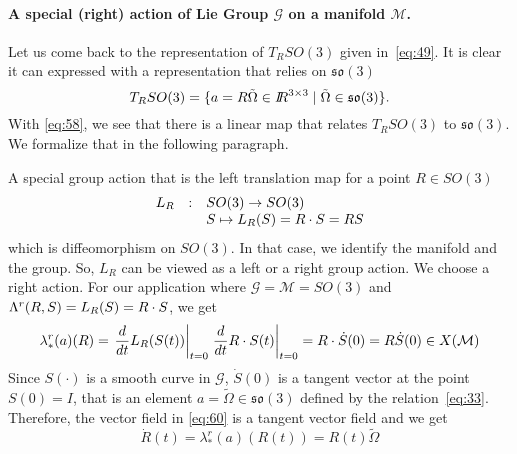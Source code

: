 \paragraph{ A special  (right)  action of Lie Group $\mathcal G$ on a manifold $\mathcal M$. } 

Let us come back to the representation of  $T_RSO(3)$ given in~\eqref{eq:49}. It is clear it can expressed with a representation that relies on $\mathfrak{so}(3)$
\begin{equation}
  \label{eq:58}
   T_RSO(3) = \{ a = R \tilde \Omega \in \mbox{\rm $I\!\!R$}^{3\times 3} \mid \tilde \Omega \in \mathfrak{so}(3) \}.
\end{equation}
With \eqref{eq:58}, we see that there is a linear map that relates $T_RSO(3)$ to  $\mathfrak{so}(3)$. We formalize that in the following paragraph.


A special group action that is  the left translation map for a point $R \in SO(3)$ 
\begin{equation}
  \label{eq:59}
  \begin{array}[lcl]{rcl}
    L_R& :&   SO(3)  \rightarrow  SO(3)\\
       & &  S  \mapsto L_R(S) = R \glaw S = RS\\
  \end{array}
\end{equation}
which is diffeomorphism on $SO(3)$. In that case, we identify the manifold and the group. So, $L_R$ can be viewed as a left or a right group action. We choose a right action. For our application where $\mathcal G = \mathcal M = SO(3)$ and $\Lambda^r(R,S) = L_{R}(S) =  R \cdot S $, we get
\begin{equation}
  \label{eq:60}
   \lambda^r_{*}(a)(R) = \left. \frac{d}{dt} L_{R}(S(t)) \right|_{t=0} \left. \frac{d}{dt} R \cdot S(t) \right|_{t=0} =  R \cdot \dot S(0) = R  \dot S(0)  \in X(\mathcal M)
\end{equation}
Since $S(\cdot)$ is a smooth curve in $\mathcal G$, $\dot S(0)$ is a tangent vector at the point $S(0)=I$, that is an element $a = \tilde \Omega  \in \mathfrak{so}(3) $ defined by the relation~\eqref{eq:33}. Therefore, the vector field in \eqref{eq:60} is a tangent vector field and we get
\begin{equation}
  \label{eq:61}
  \dot R(t) = \lambda^r_{*}(a)(R(t)) = R(t)  \tilde \Omega
\end{equation}



